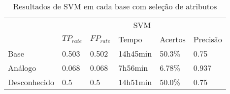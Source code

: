 \begin{table}[h]
    \centering
    \caption{Resultados de SVM em cada base com seleção de atributos}
    \label{table:svmattrless}
    \begin{tabular}{l|l|l|l|l|l|}
        \cline{2-6}
                                                                   & \multicolumn{5}{c|}{\cellcolor[HTML]{C0C0C0}SVM}          \\ \cline{2-6}
                                                                   & $TP_{rate}$ & $FP_{rate}$ & Tempo    & Acertos & Precisão \\ \hline
        \multicolumn{1}{|l|}{\cellcolor[HTML]{EFEFEF}Base}         & 0.503       & 0.502       & 14h45min & 50.3\%  & 0.75     \\ \hline
        \multicolumn{1}{|l|}{\cellcolor[HTML]{EFEFEF}Análogo}      & 0.068       & 0.068       & 7h56min  & 6.78\%  & 0.937    \\ \hline
        \multicolumn{1}{|l|}{\cellcolor[HTML]{EFEFEF}Desconhecido} & 0.5         & 0.5         & 14h51min & 50.0\%  & 0.75     \\ \hline
    \end{tabular}
\end{table}

